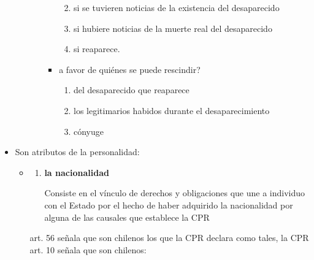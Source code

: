 \documentclass[]{article}
\providecommand{\tightlist}{%
  \setlength{\itemsep}{0pt}\setlength{\parskip}{0pt}}
\begin{document}
\begin{itemize}
\begin{itemize}
\begin{enumerate}
\begin{itemize}
        \begin{enumerate}
        \def\labelenumii{\arabic{enumii}.}
        \tightlist
        \item
          si se tuvieren noticias de la existencia del desaparecido
        \item
          si hubiere noticias de la muerte real del desaparecido
        \item
          si reaparece.
        \end{enumerate}
      \item
        a favor de quiénes se puede rescindir?

        \begin{enumerate}
        \def\labelenumii{\arabic{enumii}.}
        \tightlist
        \item
          del desaparecido que reaparece
        \item
          los legitimarios habidos durante el desaparecimiento
        \item
          cónyuge
        \end{enumerate}
      \end{itemize}
    \end{enumerate}
  \end{itemize}
\item
  Son atributos de la personalidad:

  \begin{itemize}
  \item
    \begin{enumerate}
    \def\labelenumi{\alph{enumi})}
    \item
      \textbf{la nacionalidad}

      Consiste en el vínculo de derechos y obligaciones que une a
      individuo con el Estado por el hecho de haber adquirido la
      nacionalidad por alguna de las causales que establece la CPR
    \end{enumerate}

    art. 56 señala que son chilenos los que la CPR declara como tales,
    la CPR art. 10 señala que son chilenos:


\end{itemize}
\end{itemize}
\end{document}
